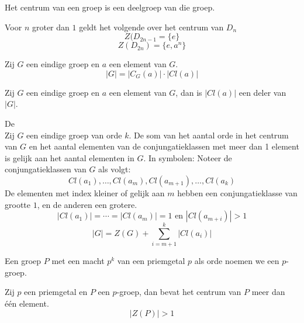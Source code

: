 \documentclass[main.tex]{subfiles}
\begin{document}
\begin{ei}
  Het centrum van een groep is een deelgroep van die groep.

\end{ei}

\begin{st}
  Voor $n$ groter dan $1$ geldt het volgende over het centrum van $D_{n}$
  \[ Z(D_{2n-1} = \{e\} \]
  \[ Z(D_{2n}) = \{e,a^{n}\} \]
  
\end{st}

\begin{st}
  Zij $G$ een eindige groep en $a$ een element van $G$.
  \[ |G| = |C_{G}(a)|\cdot|Cl(a)| \]

\end{st}

\begin{gev}
  Zij $G$ een eindige groep en $a$ een element van $G$, dan is $|Cl(a)|$ een deler van $|G|$.
  
\end{gev}

\begin{st}
  \label{st:klasvergelijking}
  De \\
  Zij $G$ een eindige groep van orde $k$.
  De som van het aantal orde in het centrum van $G$ en het aantal elementen van de conjungatieklassen met meer dan 1 element is gelijk aan het aantal elementen in $G$.
  In symbolen: Noteer de conjungatieklassen van $G$ als volgt:
  \[ Cl(a_{1}),\dotsc, Cl(a_{m}), Cl(a_{m+1}), \dotsc, Cl(a_{k}) \]
  De elementen met index kleiner of gelijk aan $m$ hebben een conjungatieklasse van grootte $1$, en de anderen een grotere.
  \[ |Cl(a_{1})| = \dotsb = |Cl(a_{m})| = 1 \text{ en } |Cl(a_{m+i})| > 1\]
  \[ |G| = Z(G) + \sum_{i=m+1}^{k}|Cl(a_{i})| \]

\end{st}

\begin{de}
  Een groep $P$ met een macht $p^{k}$ van een priemgetal $p$ als orde noemen we een $p$-groep.
\end{de}

\begin{pr}
  Zij $p$ een priemgetal en $P$ een $p$-groep, dan bevat het centrum van $P$ meer dan \'e\'en element.
  \[ |Z(P)| > 1 \]

\end{pr}
\end{document}
